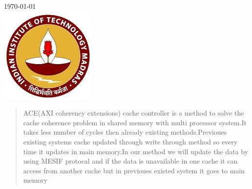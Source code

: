 \documentclass[12pt]{article}
\begin{document}
\begin{titlepage}


{\large \today}\\ [1cm]%


\includegraphics{iitmlogo2}\\[1cm] %
 

\vfill %

\end{titlepage}

\newpage
{}
\begin{abstract}
ACE(AXI coherency extensions) cache controller is a method to solve the cache coherence problem in shared memory with multi processor system.It takes less number of cycles then already existing methods.Previoues existing systems cache  updated through write through method so every time it updates in main memory.In our method we will update the data by using MESIF protocal and if the data is unavailable in one cache it can access from another cache but in previoues existed system it goes to main memory

\end{abstract}
\end{document}
